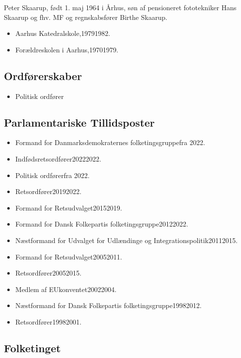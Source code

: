 \documentclass[11pt, a4paper]{awesome-cv}
\begin{document}
\makecvheader[R]
\makelettertitle
\begin{cvletter}
Peter Skaarup, født 1. maj 1964 i Århus, søn af pensioneret fototekniker Hans Skaarup og fhv. MF og regnskabsfører Birthe Skaarup.

\begin{itemize}
\item Aarhus Katedralskole,19791982.
\item Forældreskolen i Aarhus,19701979.
\end{itemize}
\subsection*{Ordførerskaber}
\begin{itemize}
\item Politisk ordfører
\end{itemize}
\subsection*{Parlamentariske Tillidsposter}
\begin{itemize}
\item Formand for Danmarksdemokraternes folketingsgruppefra 2022.
\item Indfødsretsordfører20222022.
\item Politisk ordførerfra 2022.
\item Retsordfører20192022.
\item Formand for Retsudvalget20152019.
\item Formand for Dansk Folkepartis folketingsgruppe20122022.
\item Næstformand for Udvalget for Udlændinge og Integrationspolitik20112015.
\item Formand for Retsudvalget20052011.
\item Retsordfører20052015.
\item Medlem af EUkonventet20022004.
\item Næstformand for Dansk Folkepartis folketingsgruppe19982012.
\item Retsordfører19982001.
\end{itemize}
\subsection*{Folketinget}

\end{cvletter}
\end{document}
